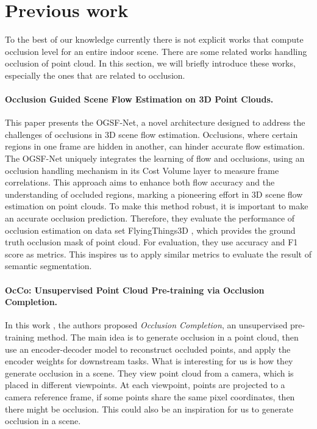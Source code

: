 \documentclass[11pt, a4paper,oneside,chapterprefix=false]{scrbook}
\begin{document}
\section{Previous work}
To the best of our knowledge currently there is not explicit works that compute occlusion level for an entire indoor scene. There are some related works handling occlusion of point cloud. In this section, we will briefly introduce these works, especially the ones that are related to occlusion.  


\paragraph{Occlusion Guided Scene Flow Estimation on 3D Point Clouds.} \label{par:scene flow}

This paper \cite{OR:21} presents the OGSF-Net, a novel architecture designed to address the challenges of occlusions in 3D scene flow estimation. Occlusions, where certain regions in one frame are hidden in another, can hinder accurate flow estimation. The OGSF-Net uniquely integrates the learning of flow and occlusions, using an occlusion handling mechanism in its Cost Volume layer to measure frame correlations. This approach aims to enhance both flow accuracy and the understanding of occluded regions, marking a pioneering effort in 3D scene flow estimation on point clouds. To make this method robust, it is important to make an accurate occlusion prediction. Therefore, they evaluate the performance of occlusion estimation on data set FlyingThings3D \cite{MIFDB16}, which provides the ground truth occlusion mask of point cloud. For evaluation, they use accuracy and F1 score as metrics. This inspires us to apply similar metrics to evaluate the result of semantic segmentation.

\paragraph{OcCo: Unsupervised Point Cloud Pre-training via Occlusion Completion.} \label{par:OcCo occlusion completion}

In this work \cite{Wang:21}, the authors proposed \emph{Occlusion Completion}, an unsupervised pre-training method. The main idea is to generate occlusion in a point cloud, then use an encoder-decoder model to reconstruct occluded points, and apply the encoder weights for downstream tasks. What is interesting for us is how they generate occlusion in a scene. They view point cloud from a camera, which is placed in different viewpoints. At each viewpoint, points are projected to a camera reference frame, if some points share the same pixel coordinates, then there might be occlusion. This could also be an inspiration for us to generate occlusion in a scene.
\end{document}
